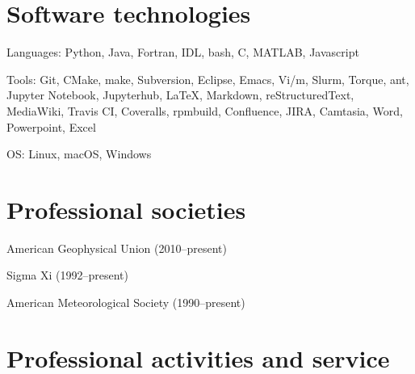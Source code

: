 \documentclass[letterpaper]{resume}
\begin{document}

\section{Software technologies}

\vspace{1.0em}
\begin{compactitem}[\itembullet]
  \item Languages: Python, Java, Fortran, IDL, bash, C, MATLAB, Javascript
  \item Tools: Git, CMake, make, Subversion, Eclipse, Emacs,
    Vi/m, Slurm, Torque, ant, Jupyter Notebook,
    Jupyterhub, \LaTeX, Markdown, reStructuredText, MediaWiki,
    Travis CI, Coveralls, rpmbuild, Confluence, JIRA, Camtasia,
    Word, Powerpoint, Excel
  \item OS: Linux, macOS, Windows
\end{compactitem}


\section{Professional societies}

\vspace{1.0em}
\begin{compactitem}[\itembullet]
  \item American Geophysical Union (2010--present) 
  \item Sigma Xi (1992--present)
  \item American Meteorological Society (1990--present)
\end{compactitem}


\section{Professional activities and service}
\end{document}
